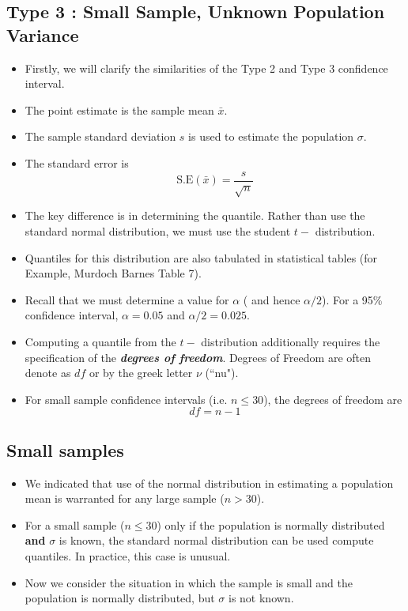 \documentclass[a4paper,12pt]{article}
\begin{document}
\subsection*{Type 3 : Small Sample, Unknown Population Variance}
\begin{itemize}
\item Firstly, we will clarify the similarities of the Type 2 and Type 3 confidence interval.
\item The point estimate is the sample mean $\bar{x}$.
\item The sample standard deviation $s$ is used to estimate the population $\sigma$.
\item The standard error is
\[ \mbox{S.E}(\bar{x}) = \frac{s}{\sqrt{n}}\]


\item The key difference is in determining the quantile. Rather than use the standard normal distribution, we must use the student $t-$ distribution. 
\item Quantiles for this distribution are also tabulated in statistical tables (for Example, Murdoch Barnes Table 7).
\item Recall that we must determine a value for $\alpha$ ( and hence $\alpha/2$). For a 95\% confidence interval, $\alpha= 0.05$  and $\alpha/2 = 0.025$.
\item Computing a quantile from the $t-$ distribution additionally requires the specification of the \textit{\textbf{degrees of freedom}}. Degrees of Freedom are often denote as $df$ or by the greek letter $\nu$ (``nu").
\item For small sample confidence intervals (i.e. $n \leq 30$), the degrees of freedom are
\[ df = n-1 \]
\end{itemize}














\subsection*{Small samples}
\begin{itemize} \item We indicated that use of the normal distribution in estimating a population mean is warranted
for any large sample ($n > 30$). \item For a small sample ($n \leq 30$) only if the population is normally distributed
\textbf{and} $\sigma$ is known, the standard normal distribution can be used compute quantiles. In practice,
this case is unusual.
\item Now we consider the situation in which the sample is small and the population is normally distributed,
but $\sigma$ is not known.
\end{itemize}
\end{document}
